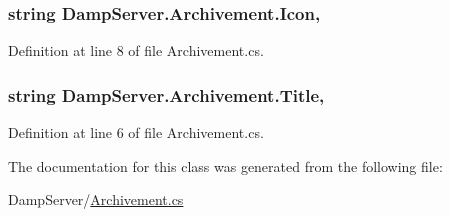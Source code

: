 \hypertarget{class_damp_server_1_1_archivement_afdeb54a6032da7f51a86dd64ffc01a38}{
\subsubsection[{Icon}]{\setlength{\rightskip}{0pt plus 5cm}string Damp\-Server.\-Archivement.\-Icon\hspace{0.3cm}{\ttfamily [get]}, {\ttfamily [set]}}}\label{class_damp_server_1_1_archivement_afdeb54a6032da7f51a86dd64ffc01a38}


Definition at line 8 of file Archivement.\-cs.

\hypertarget{class_damp_server_1_1_archivement_a5c6fe3aae5bf78863c252c2ca0ed9478}{
\subsubsection[{Title}]{\setlength{\rightskip}{0pt plus 5cm}string Damp\-Server.\-Archivement.\-Title\hspace{0.3cm}{\ttfamily [get]}, {\ttfamily [set]}}}\label{class_damp_server_1_1_archivement_a5c6fe3aae5bf78863c252c2ca0ed9478}


Definition at line 6 of file Archivement.\-cs.



The documentation for this class was generated from the following file\-:\begin{DoxyCompactItemize}
\item 
Damp\-Server/\hyperlink{_archivement_8cs}{Archivement.\-cs}\end{DoxyCompactItemize}
